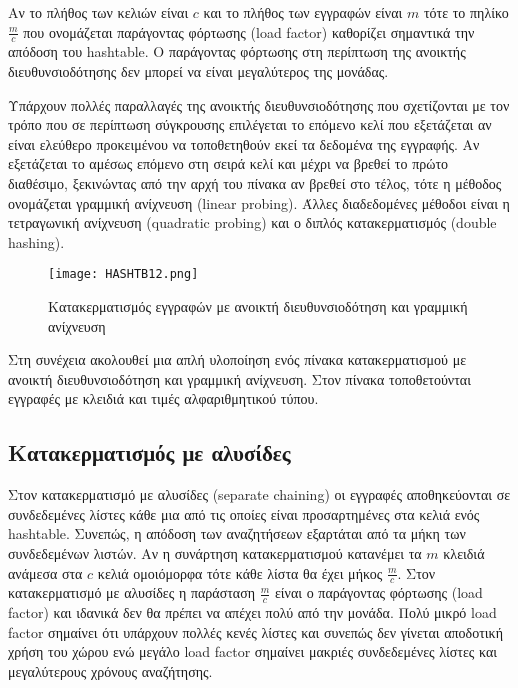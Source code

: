 Αν το πλήθος των κελιών είναι $c$ και το πλήθος των εγγραφών είναι $m$ τότε το πηλίκο $\frac{m}{c}$ που ονομάζεται παράγοντας φόρτωσης (load factor) καθορίζει σημαντικά την απόδοση του hashtable. Ο παράγοντας φόρτωσης στη περίπτωση της ανοικτής διευθυνσιοδότησης δεν μπορεί να είναι μεγαλύτερος της μονάδας.

Υπάρχουν πολλές παραλλαγές της ανοικτής διευθυνσιοδότησης που σχετίζονται με τον τρόπο που σε περίπτωση σύγκρουσης επιλέγεται το επόμενο κελί που εξετάζεται αν είναι ελεύθερο προκειμένου να τοποθετηθούν εκεί τα δεδομένα της εγγραφής. Αν εξετάζεται το αμέσως επόμενο στη σειρά κελί και μέχρι να βρεθεί το πρώτο διαθέσιμο, ξεκινώντας από την αρχή του πίνακα αν βρεθεί στο τέλος, τότε η μέθοδος ονομάζεται γραμμική ανίχνευση (linear probing). Άλλες διαδεδομένες μέθοδοι είναι η τετραγωνική ανίχνευση (quadratic probing) και ο διπλός κατακερματισμός (double hashing).

\begin{figure}[ht]
\centering
\texttt{[image: HASHTB12.png]}
\caption{Κατακερματισμός εγγραφών με ανοικτή διευθυνσιοδότηση και γραμμική ανίχνευση \cite{wiki_hashtables}}
\label{fig:hashtable2}
\end{figure}

Στη συνέχεια ακολουθεί μια απλή υλοποίηση ενός πίνακα κατακερματισμού με ανοικτή διευθυνσιοδότηση και γραμμική ανίχνευση. Στον πίνακα τοποθετούνται εγγραφές με κλειδιά και τιμές αλφαριθμητικού τύπου. 





\subsection{Κατακερματισμός με αλυσίδες}
Στον κατακερματισμό με αλυσίδες (separate chaining) οι εγγραφές αποθηκεύονται σε συνδεδεμένες λίστες κάθε μια από τις οποίες είναι προσαρτημένες στα κελιά ενός hashtable. Συνεπώς, η απόδοση των αναζητήσεων εξαρτάται από τα μήκη των συνδεδεμένων λιστών. Αν η συνάρτηση κατακερματισμού κατανέμει τα $m$ κλειδιά ανάμεσα στα $c$ κελιά ομοιόμορφα τότε κάθε λίστα θα έχει μήκος $\frac{m}{c}$. Στον κατακερματισμό με αλυσίδες η παράσταση $\frac{m}{c}$ είναι ο παράγοντας φόρτωσης (load factor) και ιδανικά δεν θα πρέπει να απέχει πολύ από την μονάδα. Πολύ μικρό load factor σημαίνει ότι υπάρχουν πολλές κενές λίστες και συνεπώς δεν γίνεται αποδοτική χρήση του χώρου ενώ μεγάλο load factor σημαίνει μακριές συνδεδεμένες λίστες και μεγαλύτερους χρόνους αναζήτησης. 

